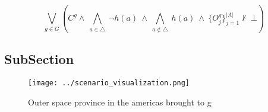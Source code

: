 \documentclass[a4paper]{article}
\begin{document}
\[\bigvee_{g\in G} (C^g \wedge\ \bigwedge_{a\in \triangle}\ \neg h(a)\ \wedge\ \bigwedge_{a\notin \triangle}\ h(a)\ \wedge\ \{O_j^g\}_{j=1}^{|A|} \nvdash\ \bot )\]

\subsection{SubSection}

\begin{figure}
\centering
\texttt{[image: ../scenario\_visualization.png]}
\caption{Outer space province in the americas brought to g
}
\end{figure}
 
\end{document}
